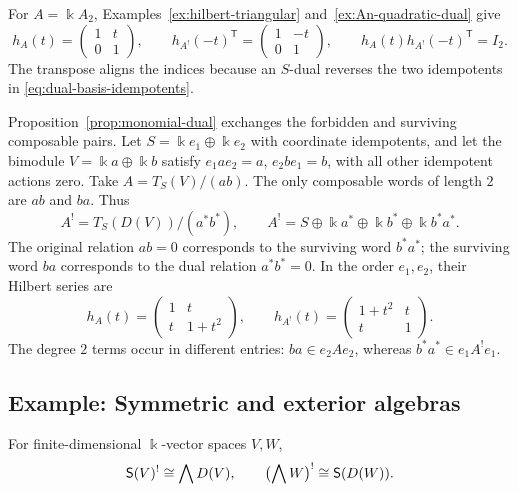 \begin{advanced}
\begin{example}\label{ex:hilbert-dual-An}
For $A=\Bbbk A_2$, Examples~\ref{ex:hilbert-triangular} and~\ref{ex:An-quadratic-dual} give
\[
h_A(t)=\begin{pmatrix}1&t\\0&1\end{pmatrix},\qquad
h_{A^!}(-t)^{\mathsf T}=\begin{pmatrix}1&-t\\0&1\end{pmatrix},\qquad
h_A(t)h_{A^!}(-t)^{\mathsf T}=I_2.
\]
The transpose aligns the indices because an $S$-dual reverses the two idempotents in \eqref{eq:dual-basis-idempotents}.
\end{example}
                   
\begin{example}\label{ex:alternating-quadratic-dual}
Proposition~\ref{prop:monomial-dual} exchanges the forbidden and surviving composable pairs.
Let $S=\Bbbk e_1\oplus\Bbbk e_2$ with coordinate idempotents, and let the bimodule $V=\Bbbk a\oplus\Bbbk b$ satisfy $e_1ae_2=a$, $e_2be_1=b$, with all other idempotent actions zero.
Take $A=T_S(V)/(ab)$.
The only composable words of length $2$ are $ab$ and $ba$. Thus
\[
A^!=T_S(D(V))/(a^*b^*),\qquad
A^!=S\oplus\Bbbk a^*\oplus\Bbbk b^*\oplus\Bbbk b^*a^*.
\]
The original relation $ab=0$ corresponds to the surviving word $b^*a^*$; the surviving word $ba$ corresponds to the dual relation $a^*b^*=0$.
In the order $e_1,e_2$, their Hilbert series are
\[
h_A(t)=\begin{pmatrix}1&t\\t&1+t^2\end{pmatrix},\qquad
h_{A^!}(t)=\begin{pmatrix}1+t^2&t\\t&1\end{pmatrix}.
\]
The degree $2$ terms occur in different entries: $ba\in e_2Ae_2$, whereas $b^*a^*\in e_1A^!e_1$.
\end{example}
\end{advanced}

\fi


\subsection{Example: Symmetric and exterior algebras}

\begin{proposition}\label{prop:symmetric-exterior-dual}
For finite-dimensional $\Bbbk$-vector spaces $V,W$,
\[
\mathsf{S}(V)^!\cong\bigwedge D(V),\qquad
\bigl(\bigwedge W\bigr)^!\cong\mathsf{S}(D(W)).
\]
\end{proposition}

